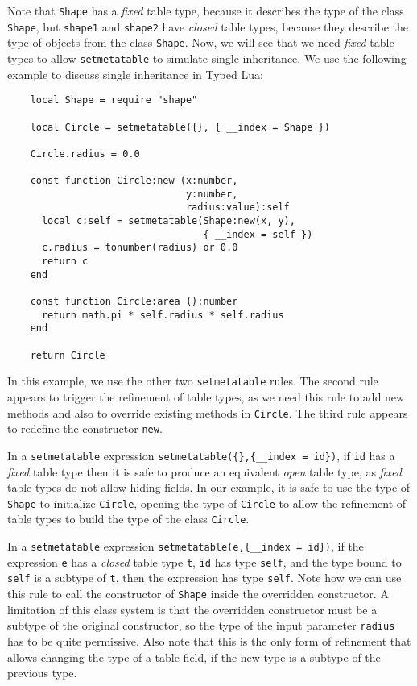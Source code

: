 Note that \texttt{Shape} has a \emph{fixed} table type, because it
describes the type of the class \texttt{Shape}, but \texttt{shape1}
and \texttt{shape2} have \emph{closed} table types, because they
describe the type of objects from the class \texttt{Shape}.
Now, we will see that we need \emph{fixed} table types to allow
\texttt{setmetatable} to simulate single inheritance.
We use the following example to discuss single inheritance in Typed Lua:
\begin{verbatim}
    local Shape = require "shape"

    local Circle = setmetatable({}, { __index = Shape })

    Circle.radius = 0.0

    const function Circle:new (x:number,
                               y:number,
                               radius:value):self
      local c:self = setmetatable(Shape:new(x, y),
                                  { __index = self })
      c.radius = tonumber(radius) or 0.0
      return c
    end

    const function Circle:area ():number
      return math.pi * self.radius * self.radius
    end

    return Circle
\end{verbatim}

In this example, we use the other two \texttt{setmetatable} rules.
The second rule appears to trigger the refinement of table types,
as we need this rule to add new methods and also to override
existing methods in \texttt{Circle}.
The third rule appears to redefine the constructor \texttt{new}.

In a \texttt{setmetatable} expression
\texttt{setmetatable(\{\},\{\string_\string_index = id\})},
if \texttt{id} has a \emph{fixed} table type then it is safe to
produce an equivalent \emph{open} table type, as \emph{fixed}
table types do not allow hiding fields.
In our example, it is safe to use the type of \texttt{Shape}
to initialize \texttt{Circle}, opening the type of \texttt{Circle}
to allow the refinement of table types to build the type of
the class \texttt{Circle}.

In a \texttt{setmetatable} expression
\texttt{setmetatable(e,\{\string_\string_index = id\})},
if the expression \texttt{e} has a \emph{closed} table type \texttt{t},
\texttt{id} has type \texttt{self}, and the type bound to \texttt{self}
is a subtype of \texttt{t}, then the expression has type \texttt{self}.
Note how we can use this rule to call the constructor of \texttt{Shape}
inside the overridden constructor.
A limitation of this class system is that the overridden constructor
must be a subtype of the original constructor,
so the type of the input parameter \texttt{radius} has to be quite permissive.
Also note that this is the only form of refinement that allows
changing the type of a table field, if the new type is a subtype
of the previous type.

